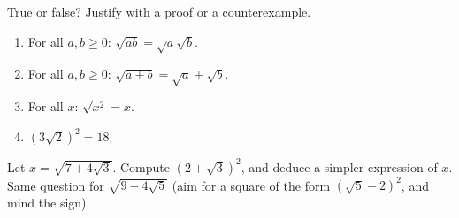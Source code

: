 \begin{exercise}[$\star\star$]\label{exo:g9:sqrt:9}
True or false? Justify with a proof or a counterexample.
\begin{enumerate}
  \item For all $a, b \geq 0$: $\sqrt{ab} = \sqrt a \sqrt b$.
  \item For all $a, b \geq 0$: $\sqrt{a+b} = \sqrt a + \sqrt b$.
  \item For all $x$: $\sqrt{x^2} = x$.
  \item $\left(3\sqrt2\right)^2 = 18$.
\end{enumerate}
\end{exercise}

\begin{exercise}[$\star\star\star$]\label{exo:g9:sqrt:10}
Let $x = \sqrt{7 + 4\sqrt3}$. Compute
$\left(2 + \sqrt3\right)^2$, and deduce a simpler expression of $x$.
Same question for $\sqrt{9 - 4\sqrt5}$ (aim for a square of the form
$\left(\sqrt5 - 2\right)^2$, and mind the sign).
\end{exercise}
